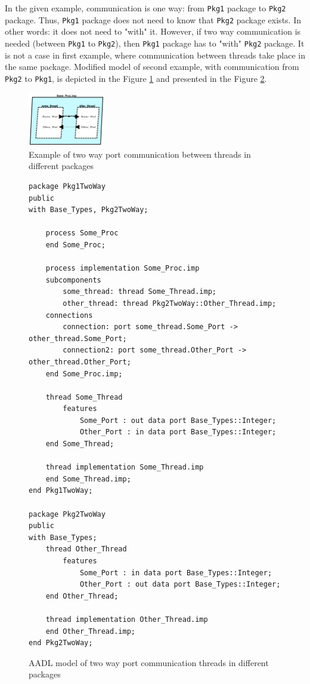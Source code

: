 In the given example, communication is one way: from \lstinline{Pkg1} package to \lstinline{Pkg2} package. Thus, \lstinline{Pkg1} package does not need to know that \lstinline{Pkg2} package exists. In other words: it does not need to "with" it. However, if two way communication is needed (between \lstinline{Pkg1} to \lstinline{Pkg2}), then \lstinline{Pkg1} package has to "with" \lstinline{Pkg2} package. It is not a case in first example, where communication between threads take place in the same package. Modified model of second example, with communication from \lstinline{Pkg2} to \lstinline{Pkg1}, is depicted in the Figure \ref{figure:port_communication_thread_two_way} and presented in the Figure \ref{listing:port_communication_thread_two_way}. 

\begin{figure}[ht]%
    \begin{center}
    	\includegraphics[width=0.3\textwidth]{figures/port-communication-thread-two-way.png}    	
    \end{center}
    \caption{Example of two way port communication between threads in different packages}
    \label{figure:port_communication_thread_two_way}
\end{figure}

\begin{figure}
\singlespacing
\begin{lstlisting}[language=aadl, frame=single, gobble=0]
package Pkg1TwoWay
public
with Base_Types, Pkg2TwoWay;

	process Some_Proc
	end Some_Proc;
	
	process implementation Some_Proc.imp
	subcomponents
		some_thread: thread Some_Thread.imp;
		other_thread: thread Pkg2TwoWay::Other_Thread.imp;
	connections
		connection: port some_thread.Some_Port -> other_thread.Some_Port;
		connection2: port some_thread.Other_Port -> other_thread.Other_Port;
	end Some_Proc.imp;

	thread Some_Thread
		features
			Some_Port : out data port Base_Types::Integer;
			Other_Port : in data port Base_Types::Integer;
	end Some_Thread;

	thread implementation Some_Thread.imp
	end Some_Thread.imp;	
end Pkg1TwoWay;

package Pkg2TwoWay
public
with Base_Types;
	thread Other_Thread
		features
			Some_Port : in data port Base_Types::Integer;
			Other_Port : out data port Base_Types::Integer;
	end Other_Thread;

	thread implementation Other_Thread.imp
	end Other_Thread.imp;
end Pkg2TwoWay;
\end{lstlisting} 
\doublespacing
\caption{AADL model of two way port communication threads in different packages}
\label{listing:port_communication_thread_two_way}
\end{figure}

